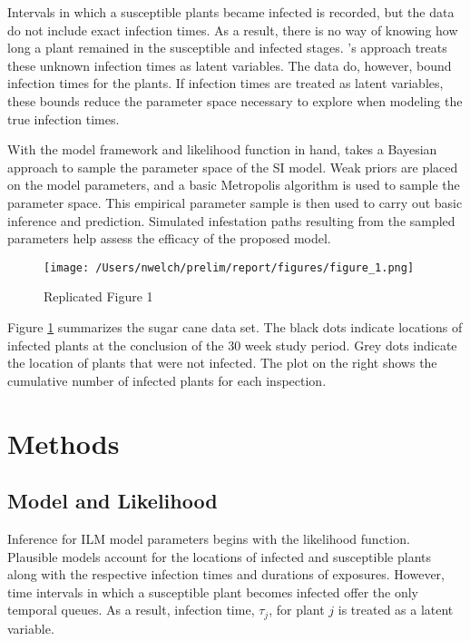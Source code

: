 \documentclass{uwstat572}
\begin{document}
Intervals in which a susceptible plants became infected is recorded, but the data do not include exact infection times.  
As a result, there is no way of knowing how long a plant remained in the susceptible and infected stages.
\cite{Brown}'s approach treats these unknown infection times as latent variables.
The data do, however, bound infection times for the plants.
If infection times are treated as latent variables, these bounds reduce the parameter space necessary to explore when modeling the true infection times. 

With the model framework and likelihood function in hand, \cite{Brown} takes a Bayesian approach to sample the parameter space of the SI model. 
Weak priors are placed on the model parameters, and a basic Metropolis algorithm is used to sample the parameter space. 
This empirical parameter sample is then used to carry out basic inference and prediction. 
Simulated infestation paths resulting from the sampled parameters help assess the efficacy of the proposed model. 

\begin{figure}[H]
\centering
\texttt{[image: /Users/nwelch/prelim/report/figures/figure\_1.png]}
\caption{Replicated Figure 1}
   \label{fig:data_plot}
\end{figure}

Figure \ref{fig:data_plot} summarizes the sugar cane data set. The black dots indicate locations of infected plants at the conclusion of the 30 week study period. Grey dots indicate the location of plants that were not infected. The plot on the right shows the cumulative number of infected plants for each inspection. 

\section{Methods}
\subsection{Model and Likelihood}

Inference for ILM model parameters begins with the likelihood function. 
Plausible models account for the locations of infected and susceptible plants along with the respective infection times and durations of exposures. 
However, time intervals in which a susceptible plant becomes infected offer the only temporal queues. 
As a result, infection time, $\tau_j$, for plant $j$ is treated as a latent variable. 
\end{document}
